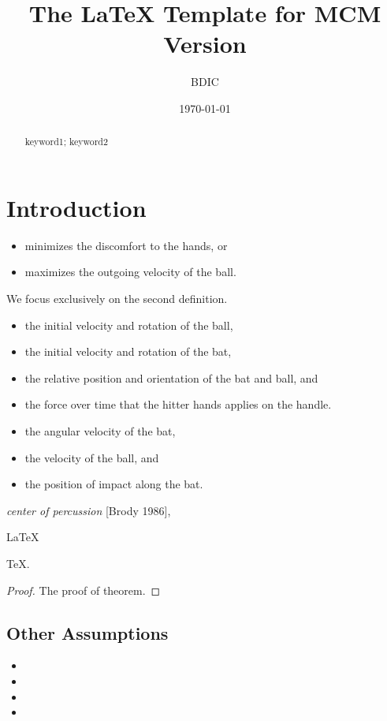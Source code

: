 \documentclass{mcmthesis}
\title{The \LaTeX{} Template for MCM Version \MCMversion}
\author{BDIC}
\date{\today}
\begin{document}
\begin{abstract}
\lipsum[1]
\begin{keywords}
keyword1; keyword2
\end{keywords}
\end{abstract}
\maketitle
{}
\tableofcontents
\newpage
{} 
\section{Introduction}

\lipsum[2]
\begin{itemize}
\item minimizes the discomfort to the hands, or
\item maximizes the outgoing velocity of the ball.
\end{itemize}
We focus exclusively on the second definition.

\begin{itemize}
\item the initial velocity and rotation of the ball,
\item the initial velocity and rotation of the bat,
\item the relative position and orientation of the bat and ball, and
\item the force over time that the hitter hands applies on the handle.
\end{itemize}
\lipsum[3]
\begin{itemize}
\item the angular velocity of the bat,
\item the velocity of the ball, and
\item the position of impact along the bat.
\end{itemize}
\lipsum[4]
\emph{center of percussion} [Brody 1986], \lipsum[5]

\begin{Theorem} \label{thm:latex}
\LaTeX
\end{Theorem}
\begin{Lemma} \label{thm:tex}
\TeX .
\end{Lemma}
\begin{proof}
The proof of theorem.
\end{proof}

\subsection{Other Assumptions}
\lipsum[6]
\begin{itemize}
\item
\item
\item
\item
\end{itemize}
\end{document}
